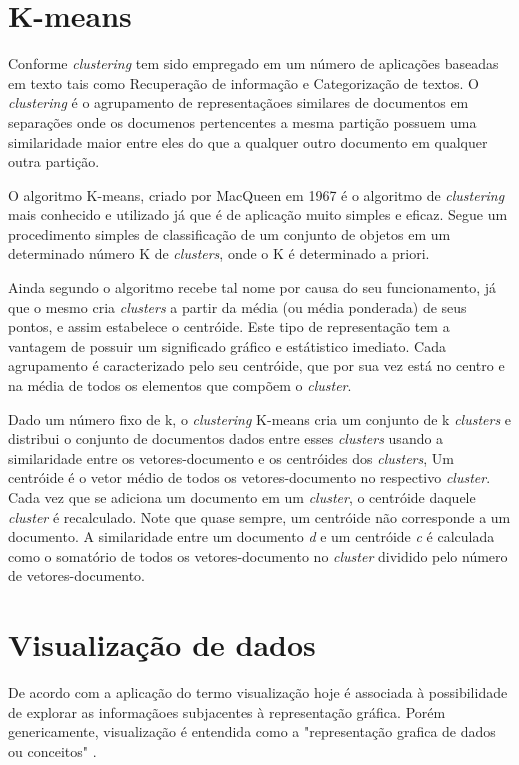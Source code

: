 \documentclass[
	12pt,				%
	openright,			%
	twoside,			%
	a4paper,			%
	english,			%
	french,				%
	spanish,			%
	brazil				%
	]{abntex2}
\begin{document}
\section{K-means}
Conforme  \emph{clustering} tem sido empregado em um número de aplicações baseadas em texto tais como Recuperação de informação e Categorização de textos. O \emph{clustering} é o agrupamento de representaçãoes similares de documentos em  separações onde os documenos pertencentes a mesma partição possuem uma similaridade maior entre eles do que a qualquer outro documento em qualquer outra partição.

O algoritmo K-means, criado por MacQueen em 1967 é o algoritmo de \emph{clustering} mais conhecido e utilizado já que é de aplicação muito simples e eficaz. Segue um procedimento simples de classificação de um conjunto de objetos em um determinado número K de \emph{clusters}, onde o K é determinado a priori.\cite{cambronero2006algoritmos}

Ainda segundo  o algoritmo recebe tal nome por causa do seu funcionamento, já que o mesmo cria \emph{clusters} a partir da média (ou média ponderada) de seus pontos, e assim estabelece o centróide. Este tipo de representação tem a vantagem de possuir um significado gráfico e estátistico imediato. Cada agrupamento é caracterizado pelo seu centróide, que por sua vez está no centro e na média de todos os elementos que compõem o \emph{cluster}.

Dado um número fixo de k, o \emph{clustering} K-means cria um conjunto de k \emph{clusters} e distribui o conjunto de documentos dados entre esses \emph{clusters} usando a similaridade entre os vetores-documento e os centróides dos \emph{clusters}, Um centróide é o vetor médio de todos os vetores-documento no respectivo \emph{cluster}. Cada vez que se adiciona um documento em um \emph{cluster}, o centróide daquele \emph{cluster} é recalculado. Note que quase sempre, um centróide não corresponde a um documento. A similaridade entre um documento \emph{d} e um centróide \emph{c} é calculada como o somatório de todos os vetores-documento no \emph{cluster} dividido pelo número de vetores-documento.\cite[p.53]{lopes2004mineraccao}

\section{Visualização de dados}
De acordo com  a aplicação do termo visualização hoje é associada à possibilidade de explorar as informaçãoes subjacentes à representação gráfica. Porém genericamente, visualização é entendida como a "representação grafica de dados ou conceitos" .
\end{document}
